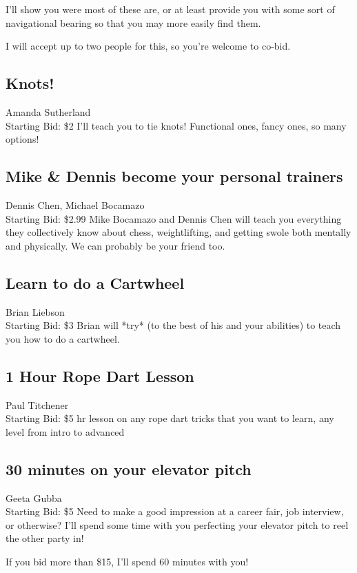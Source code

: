 \documentclass[11pt]{article}
\begin{document}
I'll show you were most of these are, or at least provide you with some sort of navigational bearing so that you may more easily find them.

I will accept up to two people for this, so you're welcome to co-bid.
\subsection{Knots!}
Amanda Sutherland
\\
Starting Bid: \$2
\newline
I'll teach you to tie knots! Functional ones, fancy ones, so many options!
\subsection{Mike \& Dennis become your personal trainers}
Dennis Chen, Michael Bocamazo
\\
Starting Bid: \$2.99
\newline
Mike Bocamazo and Dennis Chen will teach you everything they collectively know about chess, weightlifting, and getting swole both mentally and physically. We can probably be your friend too.
\subsection{Learn to do a Cartwheel}
Brian Liebson
\\
Starting Bid: \$3
\newline
Brian will *try* (to the best of his and your abilities) to teach you how to do a cartwheel.
\subsection{1 Hour Rope Dart Lesson}
Paul Titchener
\\
Starting Bid: \$5
 hr lesson on any rope dart tricks that you want to learn, any level from intro to advanced
\subsection{30 minutes on your elevator pitch}
Geeta Gubba
\\
Starting Bid: \$5
\newline
Need to make a good impression at a career fair, job interview, or otherwise? I'll spend some time with you perfecting your elevator pitch to reel the other party in!

If you bid more than \$15, I'll spend 60 minutes with you!
\end{document}
